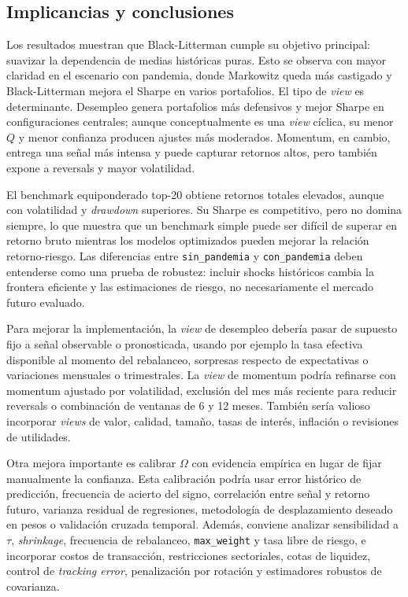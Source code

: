 \subsection*{Implicancias y conclusiones}

Los resultados muestran que Black-Litterman cumple su objetivo principal:
suavizar la dependencia de medias hist\'oricas puras. Esto se observa con mayor
claridad en el escenario con pandemia, donde Markowitz queda m\'as castigado y
Black-Litterman mejora el Sharpe en varios portafolios. El tipo de \textit{view}
es determinante. Desempleo genera portafolios m\'as defensivos y mejor Sharpe en
configuraciones centrales; aunque conceptualmente es una \textit{view}
c\'iclica, su menor $Q$ y menor confianza producen ajustes m\'as moderados.
Momentum, en cambio, entrega una se\~nal m\'as intensa y puede capturar retornos
altos, pero tambi\'en expone a reversals y mayor volatilidad.

El benchmark equiponderado top-20 obtiene retornos totales elevados, aunque con
volatilidad y \textit{drawdown} superiores. Su Sharpe es competitivo, pero no
domina siempre, lo que muestra que un benchmark simple puede ser dif\'icil de
superar en retorno bruto mientras los modelos optimizados pueden mejorar la
relaci\'on retorno-riesgo. Las diferencias entre \texttt{sin\_pandemia} y
\texttt{con\_pandemia} deben entenderse como una prueba de robustez: incluir
shocks hist\'oricos cambia la frontera eficiente y las estimaciones de riesgo, no
necesariamente el mercado futuro evaluado.

Para mejorar la implementaci\'on, la \textit{view} de desempleo deber\'ia pasar de
supuesto fijo a se\~nal observable o pronosticada, usando por ejemplo la tasa
efectiva disponible al momento del rebalanceo, sorpresas respecto de
expectativas o variaciones mensuales o trimestrales. La \textit{view} de
momentum podr\'ia refinarse con momentum ajustado por volatilidad, exclusi\'on del
mes m\'as reciente para reducir reversals o combinaci\'on de ventanas de 6 y
12 meses. Tambi\'en ser\'ia valioso incorporar \textit{views} de valor, calidad,
tama\~no, tasas de inter\'es, inflaci\'on o revisiones de utilidades.

Otra mejora importante es calibrar $\Omega$ con evidencia emp\'irica en lugar de
fijar manualmente la confianza. Esta calibraci\'on podr\'ia usar error hist\'orico
de predicci\'on, frecuencia de acierto del signo, correlaci\'on entre se\~nal y
retorno futuro, varianza residual de regresiones, metodolog\'ia de
desplazamiento deseado en pesos o validaci\'on cruzada temporal. Adem\'as,
conviene analizar sensibilidad a $\tau$, \textit{shrinkage}, frecuencia de
rebalanceo, \texttt{max\_weight} y tasa libre de riesgo, e incorporar costos de
transacci\'on, restricciones sectoriales, cotas de liquidez, control de
\textit{tracking error}, penalizaci\'on por rotaci\'on y estimadores robustos de
covarianza.

